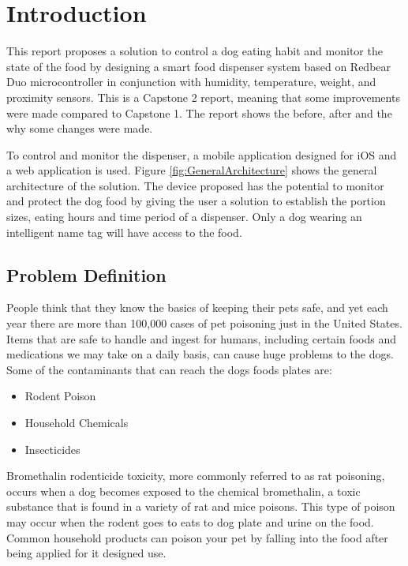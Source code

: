 \documentclass[12pt]{article}
\begin{document}
\newpage

\tableofcontents
\listoffigures
\listoftables

\newpage


\section{Introduction}

This report proposes a solution to control a dog eating habit and monitor the state of the food by designing a smart food dispenser system based on Redbear Duo microcontroller in conjunction with humidity, temperature, weight, and proximity sensors. This is a Capstone 2 report, meaning that some improvements were made compared to Capstone 1. The report shows the before, after and the why some changes were made.

To control and monitor the dispenser, a mobile application designed for iOS and a web application is used. Figure \ref{fig:GeneralArchitecture} shows the general architecture of the solution. The device proposed has the potential to monitor and protect the dog food by giving the user a solution to establish the portion sizes, eating hours and time period of a dispenser. Only a dog wearing an intelligent name tag will have access to the food.

\subsection{Problem Definition}

People think that they know the basics of keeping their pets safe, and yet each year there are more than 100,000 cases of pet poisoning just in the United States. Items that are safe to handle and ingest for humans, including certain foods and medications we may take on a daily basis, can cause huge problems to the dogs. Some of the contaminants that can reach the dogs foods plates are:

\begin{itemize}
  \item Rodent Poison
  \item Household Chemicals
  \item Insecticides
\end{itemize}

Bromethalin rodenticide toxicity, more commonly referred to as rat poisoning, occurs when a dog becomes exposed to the chemical bromethalin, a toxic substance that is found in a variety of rat and mice poisons. This type of poison may occur when the rodent goes to eats to dog plate and urine on the food. Common household products can poison your pet by falling into the food after being applied for it designed use.
\end{document}
